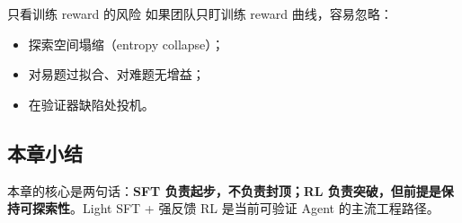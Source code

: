 \begin{warningbox}{只看训练 reward 的风险}
如果团队只盯训练 reward 曲线，容易忽略：
\begin{itemize}
    \item 探索空间塌缩（entropy collapse）；
    \item 对易题过拟合、对难题无增益；
    \item 在验证器缺陷处投机。
\end{itemize}
\end{warningbox}

\subsection{本章小结}
本章的核心是两句话：\textbf{SFT 负责起步，不负责封顶；RL 负责突破，但前提是保持可探索性}。Light SFT + 强反馈 RL 是当前可验证 Agent 的主流工程路径。

